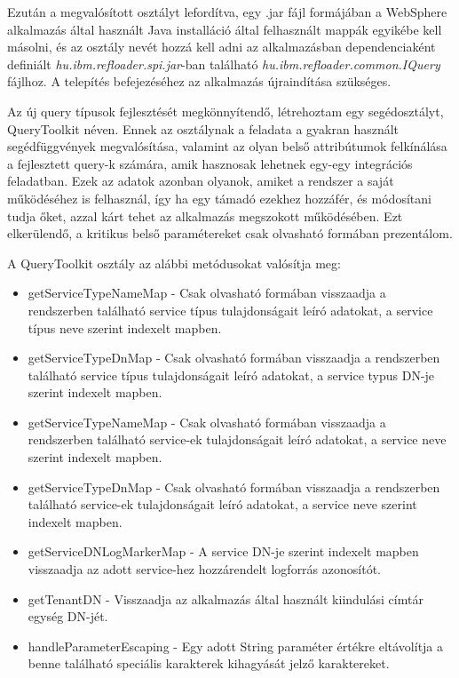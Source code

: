 Ezután a megvalósított osztályt lefordítva, egy .jar fájl formájában a WebSphere alkalmazás által használt Java installáció által felhasznált mappák egyikébe kell másolni, és az osztály nevét hozzá kell adni az alkalmazásban dependenciaként definiált \emph{hu.ibm.refloader.spi.jar}-ban található \emph{hu.ibm.refloader.common.IQuery} fájlhoz. A telepítés befejezéséhez az alkalmazás újraindítása szükséges.

Az új query típusok fejlesztését megkönnyítendő, létrehoztam egy segédosztályt, QueryToolkit néven. Ennek az osztálynak a feladata a gyakran használt segédfüggvények megvalósítása, valamint az olyan belső attribútumok felkínálása a fejlesztett query-k számára, amik hasznosak lehetnek egy-egy integrációs feladatban. Ezek az adatok azonban olyanok, amiket a rendszer a saját működéséhez is felhasznál, így ha egy támadó ezekhez hozzáfér, és módosítani tudja őket, azzal kárt tehet az alkalmazás megszokott működésében. Ezt elkerülendő, a kritikus belső paramétereket csak olvasható formában prezentálom.

A QueryToolkit osztály az alábbi metódusokat valósítja meg:

\begin{itemize}
	\item getServiceTypeNameMap - Csak olvasható formában visszaadja a rendszerben található service típus tulajdonságait leíró adatokat, a service típus neve szerint indexelt mapben.
	\item getServiceTypeDnMap - Csak olvasható formában visszaadja a rendszerben található service típus tulajdonságait leíró adatokat, a service typus DN-je szerint indexelt mapben.
	\item getServiceTypeNameMap - Csak olvasható formában visszaadja a rendszerben található service-ek tulajdonságait leíró adatokat, a service neve szerint indexelt mapben.
	\item getServiceTypeDnMap - Csak olvasható formában visszaadja a rendszerben található service-ek tulajdonságait leíró adatokat, a service neve szerint indexelt mapben.
	\item getServiceDNLogMarkerMap - A service DN-je szerint indexelt mapben visszaadja az adott service-hez hozzárendelt logforrás azonosítót.
	\item getTenantDN - Visszaadja az alkalmazás által használt kiindulási címtár egység DN-jét.
	\item handleParameterEscaping - Egy adott String paraméter értékre eltávolítja a benne található speciális karakterek kihagyását jelző karaktereket.
\end{itemize}
